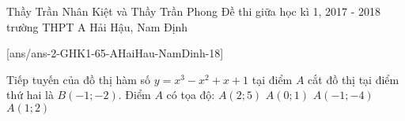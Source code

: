 \begin{name}
{Thầy Trần Nhân Kiệt và Thầy Trần Phong}
{Đề thi giữa học kì 1, 2017 - 2018 trường THPT A Hải Hậu, Nam Định}
\end{name}
\setcounter{ex}{0}

[ans/ans-2-GHK1-65-AHaiHau-NamDinh-18]

\begin{ex}%
Tiếp tuyến của đồ thị hàm số $ y=x^3-x^2+x+1 $ tại điểm $ A $ cắt đồ thị tại điểm thứ hai là $ B(-1;-2) $. Điểm $ A $ có tọa độ:
\choice
{$A(2;5) $}
{$ A(0;1) $}
{$ A(-1;-4) $}
{\True $ A(1;2) $}
\end{ex}

